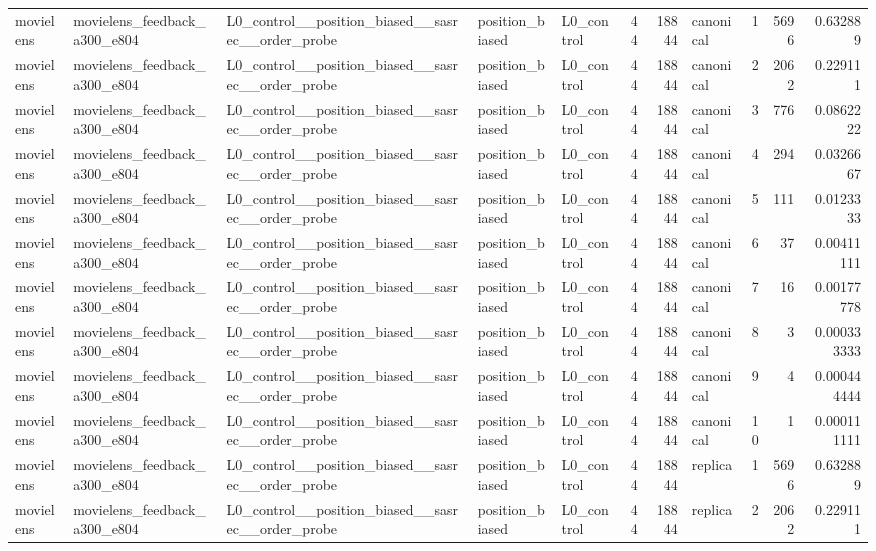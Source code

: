 \begin{table}[htbp!]
\begin{tabular}{lllllrrlrrr}
movielens & movielens\_feedback\_a300\_e804 & L0\_control\_\_position\_biased\_\_sasrec\_\_order\_probe & position\_biased & L0\_control & 44 & 18844 & canonical & 1 & 5696 & 0.632889 \\
movielens & movielens\_feedback\_a300\_e804 & L0\_control\_\_position\_biased\_\_sasrec\_\_order\_probe & position\_biased & L0\_control & 44 & 18844 & canonical & 2 & 2062 & 0.229111 \\
movielens & movielens\_feedback\_a300\_e804 & L0\_control\_\_position\_biased\_\_sasrec\_\_order\_probe & position\_biased & L0\_control & 44 & 18844 & canonical & 3 & 776 & 0.0862222 \\
movielens & movielens\_feedback\_a300\_e804 & L0\_control\_\_position\_biased\_\_sasrec\_\_order\_probe & position\_biased & L0\_control & 44 & 18844 & canonical & 4 & 294 & 0.0326667 \\
movielens & movielens\_feedback\_a300\_e804 & L0\_control\_\_position\_biased\_\_sasrec\_\_order\_probe & position\_biased & L0\_control & 44 & 18844 & canonical & 5 & 111 & 0.0123333 \\
movielens & movielens\_feedback\_a300\_e804 & L0\_control\_\_position\_biased\_\_sasrec\_\_order\_probe & position\_biased & L0\_control & 44 & 18844 & canonical & 6 & 37 & 0.00411111 \\
movielens & movielens\_feedback\_a300\_e804 & L0\_control\_\_position\_biased\_\_sasrec\_\_order\_probe & position\_biased & L0\_control & 44 & 18844 & canonical & 7 & 16 & 0.00177778 \\
movielens & movielens\_feedback\_a300\_e804 & L0\_control\_\_position\_biased\_\_sasrec\_\_order\_probe & position\_biased & L0\_control & 44 & 18844 & canonical & 8 & 3 & 0.000333333 \\
movielens & movielens\_feedback\_a300\_e804 & L0\_control\_\_position\_biased\_\_sasrec\_\_order\_probe & position\_biased & L0\_control & 44 & 18844 & canonical & 9 & 4 & 0.000444444 \\
movielens & movielens\_feedback\_a300\_e804 & L0\_control\_\_position\_biased\_\_sasrec\_\_order\_probe & position\_biased & L0\_control & 44 & 18844 & canonical & 10 & 1 & 0.000111111 \\
movielens & movielens\_feedback\_a300\_e804 & L0\_control\_\_position\_biased\_\_sasrec\_\_order\_probe & position\_biased & L0\_control & 44 & 18844 & replica & 1 & 5696 & 0.632889 \\
movielens & movielens\_feedback\_a300\_e804 & L0\_control\_\_position\_biased\_\_sasrec\_\_order\_probe & position\_biased & L0\_control & 44 & 18844 & replica & 2 & 2062 & 0.229111 \\

\end{tabular}
\end{table}
